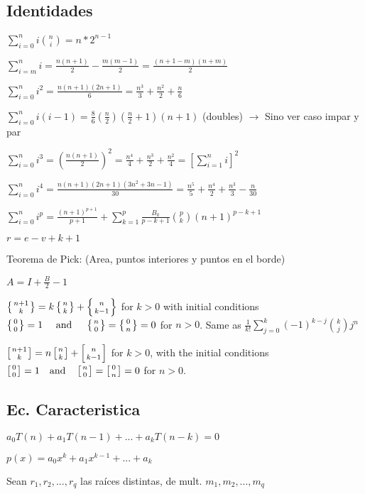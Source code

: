 \subsection{Identidades}
{

$\sum_{i=0}^n i\binom{n}{i}=n*2^{n-1}$

$\sum_{i=m}^n i = \frac{n(n+1)}{2} - \frac{m(m-1)}{2} = \frac{(n+1-m)(n+m)}{2}$


$\sum_{i=0}^n i^2 = \frac{n(n+1)(2n+1)}{6} = \frac{n^3}{3} + \frac{n^2}{2} + \frac{n}{6}$

$\sum_{i=0}^n i(i-1) = \frac{8}{6}(\frac{n}{2})(\frac{n}{2}+1)(n+1)$ (doubles) $\rightarrow$ Sino ver caso impar y par

$\sum_{i=0}^n i^3 = \left(\frac{n(n+1)}{2}\right)^2 = \frac{n^4}{4} + \frac{n^3}{2} + \frac{n^2}{4} = \left[\sum_{i=1}^n i\right]^2$

$\sum_{i=0}^n i^4 = \frac{n(n+1)(2n+1)(3n^2+3n-1)}{30} = \frac{n^5}{5} + \frac{n^4}{2} + \frac{n^3}{3} - \frac{n}{30}$

$\sum_{i=0}^n i^p = \frac{(n+1)^{p+1}}{p+1} + \sum_{k=1}^p\frac{B_k}{p-k+1}{p\choose k}(n+1)^{p-k+1}$

$r=e-v+k+1$

Teorema de Pick: (Area, puntos interiores y puntos en el borde)

$A=I+\frac{B}{2}-1$

$\left\{{n+1\atop k}\right\} = k \left\{{ n \atop k }\right\} + \left\{{n\atop k-1}\right\}$
for $k > 0$ with initial conditions
$\left\{{ 0 \atop 0 }\right\} = 1
\quad \mbox{ and } \quad
\left\{{ n \atop 0 }\right\} = \left\{{ 0 \atop n }\right\} = 0$
for $n > 0$.
Same as $\frac{1}{k!}\sum_{j=0}^{k}(-1)^{k-j}{k \choose j} j^n$

$\left[{n+1\atop k}\right] = n \left[{n\atop k}\right] + \left[{n\atop k-1}\right]$
for $k > 0$, with the initial conditions
$\left[{0\atop 0}\right] = 1 \quad\mbox{and}\quad \left[{n\atop 0}\right]=\left[{0\atop n}\right]=0$
for $n > 0$.


}%
\subsection{Ec. Caracteristica}
$a_0T(n)+a_1T(n-1)+...+a_kT(n-k)=0$

$p(x)=a_0 x^k + a_1 x^{k-1} + ... + a_k$

Sean $r_1,r_2,...,r_q$ las raíces distintas, de mult. $m_1, m_2, ..., m_q$

